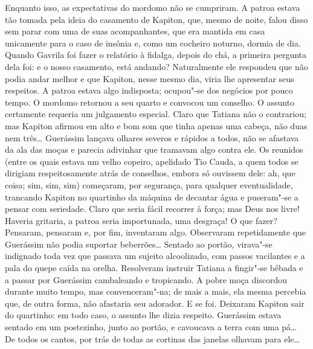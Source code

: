 Enquanto isso, as expectativas do mordomo não se cumpriram. A patroa
estava tão tomada pela ideia do casamento de Kapiton, que, mesmo de
noite, falou disso sem parar com uma de suas acompanhantes, que era
mantida em casa unicamente para o caso de insônia e, como um cocheiro
noturno, dormia de dia. Quando Gavrila foi fazer o relatório à fidalga,
depois do chá, a primeira pergunta dela foi: e o nosso casamento, está
andando? Naturalmente ele respondeu que não podia andar melhor e que
Kapiton, nesse mesmo dia, viria lhe apresentar seus respeitos. A patroa
estava algo indisposta; ocupou"-se dos negócios por pouco tempo. O
mordomo retornou a seu quarto e convocou um conselho. O assunto
certamente requeria um julgamento especial. Claro que Tatiana não o
contrariou; mas Kapiton afirmou em alto e bom som que tinha apenas uma
cabeça, não duas nem três\ldots{} Guerássim lançava olhares severos e rápidos
a todos, não se afastava da ala das moças e parecia adivinhar que
tramavam algo contra ele. Os reunidos (entre os quais estava um
velho copeiro, apelidado Tio Cauda, a quem todos se dirigiam
respeitosamente atrás de conselhos, embora só ouvissem dele: ah, que
coisa; sim, sim, sim) começaram, por segurança, para qualquer
eventualidade, trancando Kapiton no quartinho da máquina de decantar
água e puseram"-se a pensar com seriedade. Claro que seria fácil recorrer
à força; mas Deus nos livre! Haveria gritaria, a patroa seria
importunada, uma desgraça! O que fazer? Pensaram, pensaram e, por fim,
inventaram algo. Observaram repetidamente que Guerássim não podia
suportar beberrões\ldots{} Sentado ao portão, virava"-se indignado toda vez
que passava um sujeito alcoolizado, com passos vacilantes e a pala do
quepe caída na orelha. Resolveram instruir Tatiana a fingir"-se bêbada e
a passar por Guerássim cambaleando e tropicando. A pobre moça discordou
durante muito tempo, mas convenceram"-na; de mais a mais, ela mesma
percebia que, de outra forma, não afastaria seu adorador. E se foi.
Deixaram Kapiton sair do quartinho: em todo caso, o assunto lhe dizia
respeito. Guerássim estava sentado em um postezinho, junto ao portão, e
cavoucava a terra com uma pá\ldots{} De todos os cantos, por trás de todas as
cortinas das janelas olhavam para ele\ldots{}


